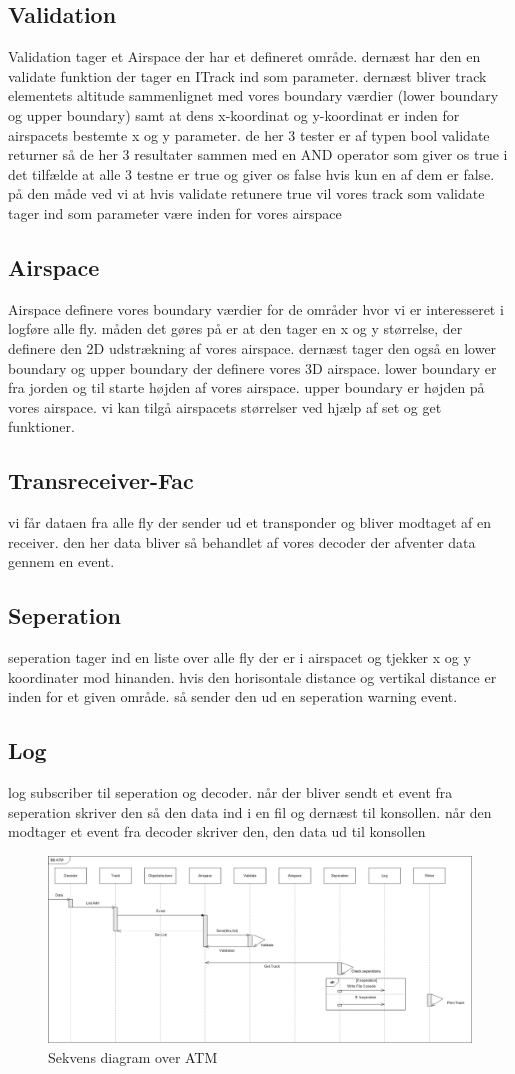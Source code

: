 \subsection{Validation}
Validation tager et Airspace der har et defineret område. dernæst har den en validate funktion der tager en ITrack ind som parameter. dernæst bliver track elementets altitude sammenlignet med vores boundary værdier (lower boundary og upper boundary) samt at dens x-koordinat og y-koordinat er inden for airspacets bestemte x og y parameter. de her 3 tester er af typen bool validate returner så de her 3 resultater sammen med en AND operator som giver os true i det tilfælde at alle 3 testne er true og giver os false hvis kun en af dem er false. på den måde ved vi at hvis validate retunere true vil vores track som validate tager ind som parameter være inden for vores airspace
\subsection{Airspace}
Airspace definere vores boundary værdier for de områder hvor vi er interesseret i logføre alle fly. måden det gøres på er at den tager en x og y størrelse, der definere den 2D udstrækning af vores airspace. dernæst tager den også en lower boundary og upper boundary der definere vores 3D airspace. lower boundary er fra jorden og til starte højden af vores airspace. upper boundary er højden på vores airspace. vi kan tilgå airspacets størrelser ved hjælp af set og get funktioner.
\subsection{Transreceiver-Fac}
vi får dataen fra alle fly der sender ud et transponder og bliver modtaget af en receiver. den her data bliver så behandlet af vores decoder der afventer data gennem en event.
\subsection{Seperation}
seperation tager ind en liste over alle fly der er i airspacet og tjekker x og y koordinater mod hinanden. hvis den horisontale distance og vertikal distance er inden for et given område. så sender den ud en seperation warning event.
\subsection{Log}
log subscriber til seperation og decoder. når der bliver sendt et event fra seperation skriver den så den data ind i en fil og dernæst til konsollen. når den modtager et event fra decoder skriver den, den data ud til konsollen 


\begin{figure}[H]
	\centering
	\includegraphics[width=1\linewidth]{../Diagrammer/SD_ATM}
	\caption{Sekvens diagram over ATM}
	\label{fig:sdatm}
\end{figure}
